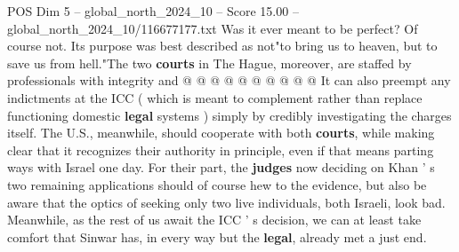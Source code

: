 \begin{textsample}{POS Dim 5 – global\_north\_2024\_10 – Score 15.00 – global\_north\_2024\_10/116677177.txt}
Was it ever meant to be perfect?
Of course not.
Its purpose was best described as not"to bring us to heaven, but to save us from hell."The two \textbf{courts} in The Hague, moreover, are staffed by professionals with integrity and @ @ @ @ @ @ @ @ @ @ It can also preempt any indictments at the ICC ( which is meant to complement rather than replace functioning domestic \textbf{legal} systems ) simply by credibly investigating the charges itself.
The U.S., meanwhile, should cooperate with both \textbf{courts}, while making clear that it recognizes their authority in principle, even if that means parting ways with Israel one day.
For their part, the \textbf{judges} now deciding on Khan ' s two remaining applications should of course hew to the evidence, but also be aware that the optics of seeking only two live individuals, both Israeli, look bad.
Meanwhile, as the rest of us await the ICC ' s decision, we can at least take comfort that Sinwar has, in every way but the \textbf{legal}, already met a just end.

\end{textsample}

